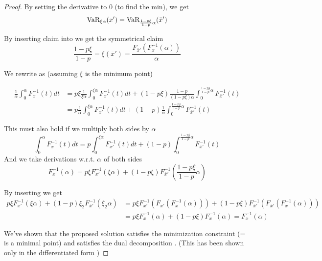 \begin{proof}
By setting the derivative to 0 (to find the min), we get
\begin{equation}\label{eqn:varvar}
\text{VaR}_{\xi\alpha}(x')= \text{VaR}_{\frac{1-p\xi}{1-p}\alpha}(\bar{x}')
\end{equation}

By inserting claim  into  we get the symmetrical claim
\begin{equation}
\dfrac{1-p\xi}{1-p} = \xi(\bar{x}') = \dfrac{F_{\bar{x}'}(F^{-1}_x(\alpha))}{\alpha}
\end{equation}

We rewrite  as (assuming $\xi$ is the minimum point)

\begin{equation}
\begin{split}
\frac{1}{\alpha} \int_0^\alpha F^{-1}_{x}(t)dt &= p\xi \frac{1}{\xi\alpha} \int_0^{\xi\alpha} F^{-1}_{x'}(t)dt + (1-p\xi)\frac{1-p}{(1-p\xi)\alpha} \int_0^{\frac{1-p\xi}{1-p}\alpha} F^{-1}_{\bar{x}'}(t)\\
&=p \frac{1}{\alpha} \int_0^{\xi\alpha} F^{-1}_{x'}(t)dt + (1-p)\frac{1}{\alpha} \int_0^{\frac{1-p\xi}{1-p}\alpha} F^{-1}_{\bar{x}'}(t)
\end{split}
\end{equation}

This must also hold if we multiply both sides by $\alpha$
\begin{equation}
\int_0^\alpha F^{-1}_{x}(t)dt = p\int_0^{\xi\alpha} F^{-1}_{x'}(t)dt + (1-p)\int_0^{\frac{1-p\xi}{1-p}\alpha} F^{-1}_{\bar{x}'}(t)
\end{equation}
And we take derivations w.r.t. $\alpha$ of both sides
\begin{equation}
F^{-1}_{x}(\alpha) = p\xi F^{-1}_{x'}(\xi\alpha) + (1-p\xi) F^{-1}_{\bar{x}'}(\frac{1-p\xi}{1-p}\alpha)
\end{equation}


By inserting  we get
\begin{equation}
\begin{split}
 p\xi F_{x'}^{-1}(\xi\alpha) + (1-p)\xi_2 F_{\bar{x}'}^{-1}\left(\xi_2\alpha\right) &= p\xi F_{x'}^{-1}(F_{x'}(F^{-1}_x(\alpha))) + (1-p\xi) F_{\bar{x}'}^{-1}\left(F_{\bar{x}'}(F^{-1}_x(\alpha))\right)\\
 &= p\xi F_x^{-1}(\alpha) + (1-p\xi)F_x^{-1}(\alpha) = F_x^{-1}(\alpha)
\end{split}
\end{equation}

We've shown that the proposed solution  satisfies the minimization constraint  (= is a minimal point) and satisfies the dual decomposition . (This has been shown only in the differentiated form )

\end{proof}


